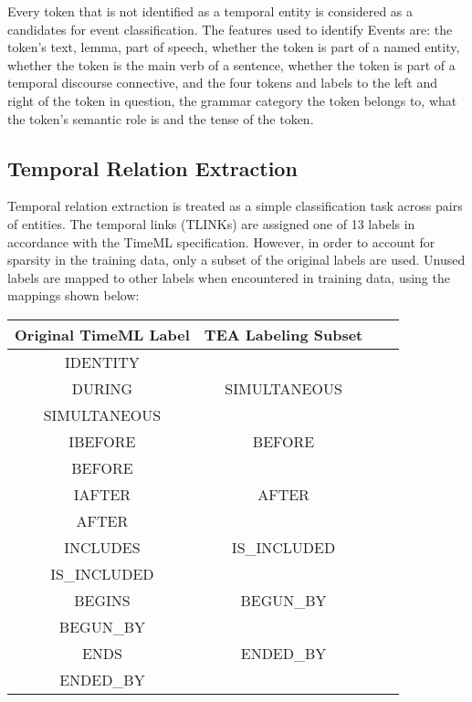 \documentclass[11pt,letterpaper]{article}
\begin{document}
Every token that is not identified as a temporal entity is considered as a candidates for event classification. The features used to identify Events are: the token's text, lemma, part of speech, whether the token is part of a named entity, whether the token is the main verb of a sentence, whether the token is part of a temporal discourse connective, and the four tokens and labels to the left and right of the token in question, the grammar category the token belongs to, what the token's semantic role is and the tense of the token.

\subsection{Temporal Relation Extraction}

Temporal relation extraction is treated as a simple classification task across pairs of entities. The temporal links (TLINKs) are assigned one of 13 labels in accordance with the TimeML specification. However, in order to account for sparsity in the training data, only a subset of the original labels are used. Unused labels are mapped to other labels when encountered in training data, using the mappings shown below:


\begin{center}
	\begin{tabular}{ |c|c|c|c| } 
		\hline
		\textbf{Original TimeML Label} & \textbf{TEA Labeling Subset} \\
		\hline
		IDENTITY &  \\ 
		DURING & SIMULTANEOUS \\ 
		SIMULTANEOUS &  \\ 
		\hline
		IBEFORE & BEFORE \\
		BEFORE & \\
		\hline
		IAFTER & AFTER \\
		AFTER & \\
		\hline
		INCLUDES & IS\_INCLUDED \\
		IS\_INCLUDED & \\
		\hline
		BEGINS & BEGUN\_BY \\
		BEGUN\_BY & \\
		\hline
		ENDS & ENDED\_BY \\
		ENDED\_BY & \\
		\hline
		
	\end{tabular}
\end{center}

\vspace{5mm}
\end{document}
